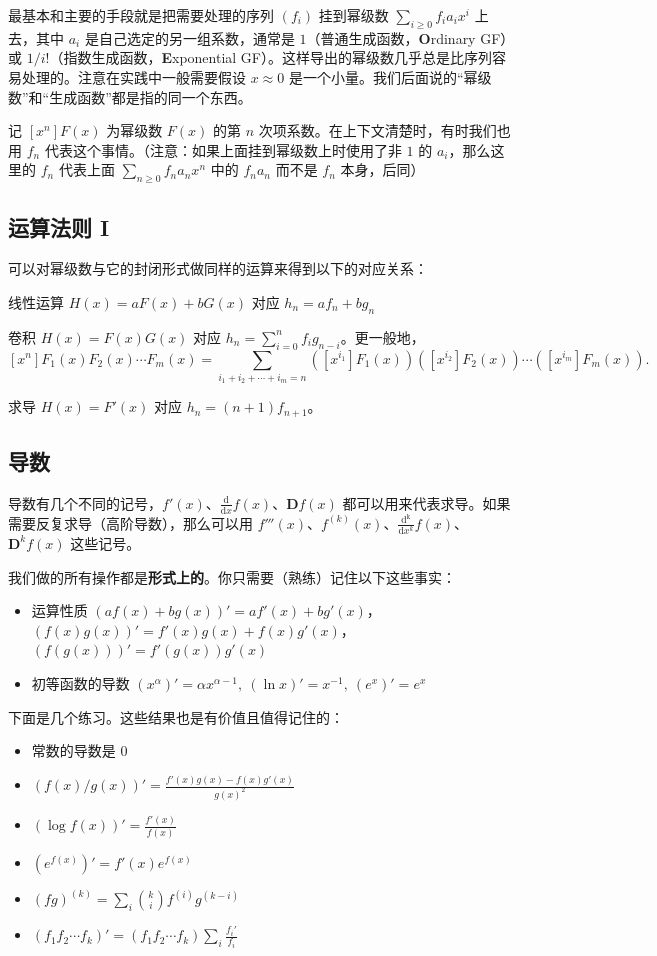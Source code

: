     最基本和主要的手段就是把需要处理的序列 $(f_i)$ 挂到幂级数 $\sum_{i\ge 0}f_i a_i x^i$ 上去，其中 $a_i$ 是自己选定的另一组系数，通常是 $1$（普通生成函数，\textbf{O}rdinary GF）或 $1/i!$（指数生成函数，\textbf{E}xponential GF）。这样导出的幂级数几乎总是比序列容易处理的。注意在实践中一般需要假设 $x\approx 0$ 是一个小量。我们后面说的“幂级数”和“生成函数”都是指的同一个东西。

    记 $[x^n]F(x)$ 为幂级数 $F(x)$ 的第 $n$ 次项系数。在上下文清楚时，有时我们也用 $f_n$ 代表这个事情。（注意：如果上面挂到幂级数上时使用了非 $1$ 的 $a_i$，那么这里的 $f_n$ 代表上面 $\sum_{n\ge 0}f_na_nx^n$ 中的 $f_na_n$ 而不是 $f_n$ 本身，后同）

\subsection{运算法则 I}
    可以对幂级数与它的封闭形式做同样的运算来得到以下的对应关系：

    线性运算 $H(x)=aF(x)+bG(x)$ 对应 $h_n=af_n+bg_n$

    卷积 $H(x)=F(x)G(x)$ 对应 $h_n=\sum_{i=0}^n f_ig_{n-i}$。更一般地，
    $$
    [x^n]F_1(x)F_2(x)\cdots F_m(x)=\sum_{i_1+i_2+\cdots+i_m=n}([x^{i_1}]F_1(x))([x^{i_2}]F_2(x))\cdots ([x^{i_m}]F_m(x)).
    $$

    求导 $H(x)=F'(x)$ 对应 $h_n=(n+1)f_{n+1}$。

\subsection{导数}
    导数有几个不同的记号，$f'(x)$、$\frac{\mathrm{d}}{\mathrm{d}x} f(x)$、$\mathbf D f(x)$ 都可以用来代表求导。如果需要反复求导（高阶导数），那么可以用 $f'''(x)$、$f^{(k)}(x)$、$\frac{\mathrm{d^k}}{\mathrm{d}x^k} f(x)$、$\mathbf D^k f(x)$ 这些记号。

    我们做的所有操作都是\textbf{形式上的}。你只需要（熟练）记住以下这些事实：
    \begin{itemize}
        \item 运算性质 $(af(x)+bg(x))'=af'(x)+bg'(x)$，$(f(x)g(x))'=f'(x)g(x)+f(x)g'(x)$，$(f(g(x)))'=f'(g(x))g'(x)$
        \item 初等函数的导数 $(x^{\alpha})'=\alpha x^{\alpha-1},\ (\ln x)'=x^{-1},\ (e^x)'=e^x$
    \end{itemize}
    下面是几个练习。这些结果也是有价值且值得记住的：
    \begin{itemize}
        \item 常数的导数是 $0$
        \item $(f(x)/g(x))'=\frac{f'(x)g(x)-f(x)g'(x)}{g(x)^2}$
        \item $(\log f(x))'=\frac{f'(x)}{f(x)}$
        \item $(e^{f(x)})'=f'(x)e^{f(x)}$
        \item $(fg)^{(k)}=\sum_i \binom{k}{i}f^{(i)}g^{(k-i)}$
        \item $(f_1f_2\cdots f_k)'=(f_1f_2\cdots f_k)\sum_i\frac{f_i'}{f_i}$ 
    \end{itemize}

